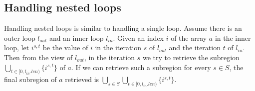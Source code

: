 \begin{comment}

Assume at runtime the number of iterations of the loop is $n$.
Let $t$ be the loop index in the original loop, where $t\in [1:n]$.
For every value defined in the loop, we add $t$ to it as a superscript to show that value in the iteration $t$.

We acquire each element of $a_0$ from $a_1$ using the index $i_1^t$.
Assume during the loop, the subregion $R$ of the array $a$ is modified.
We add a summary edge between $a_0$ and $a_3$ with subregion $\overline{R}$ in which elements of $a$ stay unchanged.



In general, for an array updated in a loop, between the output of the iteration $t$ and the output of the loop for the array (in our example, $a_3$ and $a_4$ respectively), we add a subregion showing in which part of the array they have the same elements.
Let $I$ include all indices at which the array is modified in the loop (in our example, $I=\{i_1,j_2\}$).
Then at the end of the iteration $t$, the subregion of the array that will be modified during the following iterations is $R(t,n) = \bigcup_{i\in I}{\bigcup_{t\le r\le n}{\{i^r\}}}$.
Then $R=R(0)$.
At the beginning of the iterations $t$, the subregion on with $a_0$ and $a_1$ have the same elements is $R(0,t-1)$.

\end{comment}


\subsection{Handling nested loops}
Handling nested loops is similar to handling a single loop.
Assume there is an outer loop $l_{out}$ and an inner loop $l_{in}$.
Given an index $i$ of the array $a$ in the inner loop, let $i^{s,t}$ be the value of $i$ in the iteration $s$ of $l_{out}$ and the iteration $t$ of $l_{in}$.
Then from the view of $l_{out}$, in the iteration $s$ we try to retrieve the subregion $\bigcup_{t\in[0,l_{in}.len)}{\{i^{s,t}\}}$ of $a$.
If we can retrieve such a subregion for every $s\in S$, the final subregion of $a$ retrieved is $\bigcup_{s\in S}\bigcup_{t\in[0,l_{in}.len)}{\{i^{s,t}\}}$.

